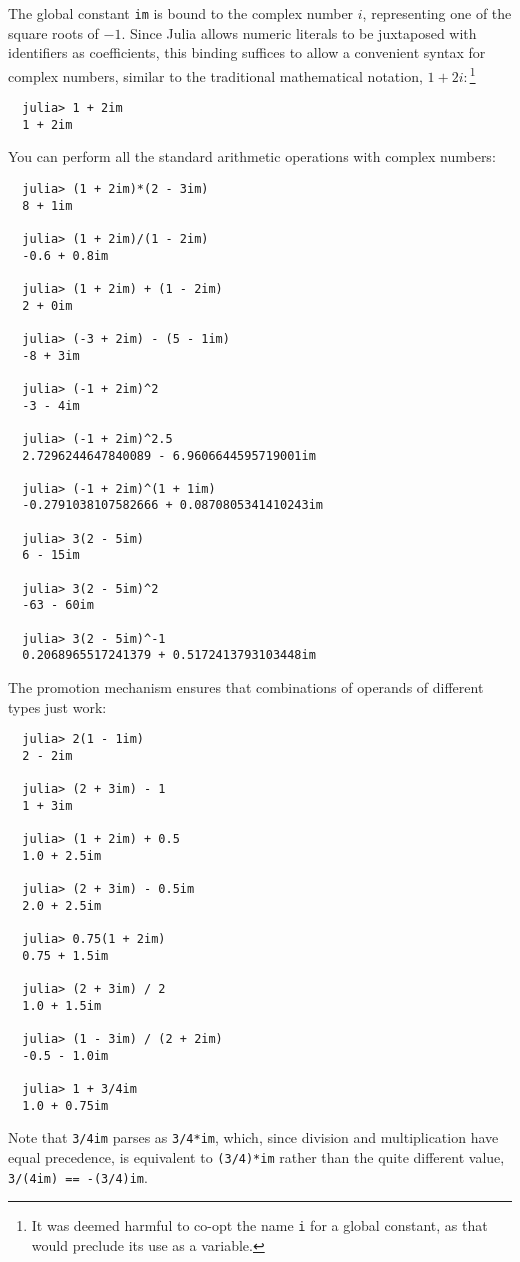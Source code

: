 \documentclass{article}
\begin{document}
The global constant \verb|im| is bound to the complex number $i$, representing one of the square roots of $-1$.
Since Julia allows numeric literals to be juxtaposed with identifiers as coefficients, this binding suffices to allow a convenient syntax for complex numbers, similar to the traditional mathematical notation, $1 + 2i$:\,\footnote{It was deemed harmful to co-opt the name \texttt{i} for a global constant, as that would preclude its use as a variable.}
\begin{verbatim}
  julia> 1 + 2im
  1 + 2im
\end{verbatim}
You can perform all the standard arithmetic operations with complex numbers:
\begin{verbatim}
  julia> (1 + 2im)*(2 - 3im)
  8 + 1im

  julia> (1 + 2im)/(1 - 2im)
  -0.6 + 0.8im

  julia> (1 + 2im) + (1 - 2im)
  2 + 0im

  julia> (-3 + 2im) - (5 - 1im)
  -8 + 3im

  julia> (-1 + 2im)^2
  -3 - 4im

  julia> (-1 + 2im)^2.5
  2.7296244647840089 - 6.9606644595719001im

  julia> (-1 + 2im)^(1 + 1im)
  -0.2791038107582666 + 0.0870805341410243im

  julia> 3(2 - 5im)
  6 - 15im

  julia> 3(2 - 5im)^2
  -63 - 60im

  julia> 3(2 - 5im)^-1
  0.2068965517241379 + 0.5172413793103448im
\end{verbatim}
The promotion mechanism ensures that combinations of operands of different types just work:
\begin{verbatim}
  julia> 2(1 - 1im)
  2 - 2im

  julia> (2 + 3im) - 1
  1 + 3im

  julia> (1 + 2im) + 0.5
  1.0 + 2.5im

  julia> (2 + 3im) - 0.5im
  2.0 + 2.5im

  julia> 0.75(1 + 2im)
  0.75 + 1.5im

  julia> (2 + 3im) / 2
  1.0 + 1.5im

  julia> (1 - 3im) / (2 + 2im)
  -0.5 - 1.0im

  julia> 1 + 3/4im
  1.0 + 0.75im
\end{verbatim}
Note that \verb|3/4im| parses as \verb|3/4*im|, which, since division and multiplication have equal precedence, is equivalent to \verb|(3/4)*im| rather than the quite different value, \verb|3/(4im) == -(3/4)im|.
\end{document}
